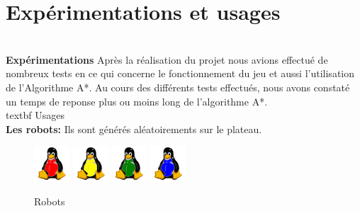 \documentclass{beamer}
\begin{document}
	\section{Expérimentations et usages}
	\begin{frame}
		\\\textbf{ Expérimentations }
		Après la réalisation du projet nous avions effectué de nombreux tests en ce qui concerne le fonctionnement du jeu et aussi l'utilisation de l'Algorithme A*.
		Au cours des différents tests effectués, nous avons constaté un temps de reponse plus ou moins long de l'algorithme A*.
		\\textbf{ Usages }
		\\\textbf{ Les robots:} Ils sont générés aléatoirements sur le plateau.
		\begin{figure}[htpb]
			\includegraphics[scale=1.0]{./images/robot-red.png}
			\includegraphics[scale=1.0]{./images/robot-yellow.png}
			\includegraphics[scale=1.0]{./images/robot-green.png}
			\includegraphics[scale=1.0]{./images/robot-blue.png}
			\caption{Robots \label{figure1} }
		\end{figure}
	\end{frame}
\end{document}
